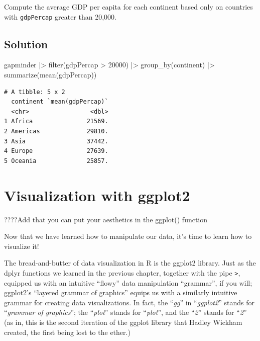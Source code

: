 \documentclass[
  letterpaper,
  DIV=11,
  numbers=noendperiod]{scrreprt}
\newenvironment{Shaded}{\begin{snugshade}}{\end{snugshade}}
\newcommand{\DecValTok}[1]{\textcolor[rgb]{0.68,0.00,0.00}{#1}}
\newcommand{\FunctionTok}[1]{\textcolor[rgb]{0.28,0.35,0.67}{#1}}
\newcommand{\NormalTok}[1]{\textcolor[rgb]{0.00,0.23,0.31}{#1}}
\newcommand{\SpecialCharTok}[1]{\textcolor[rgb]{0.37,0.37,0.37}{#1}}
\begin{document}
Compute the average GDP per capita for each continent based only on
countries with \texttt{gdpPercap} greater than 20,000.

\section{Solution}

\begin{Shaded}
\begin{Highlighting}[]
\NormalTok{gapminder }\SpecialCharTok{|\textgreater{}}
  \FunctionTok{filter}\NormalTok{(gdpPercap }\SpecialCharTok{\textgreater{}} \DecValTok{20000}\NormalTok{) }\SpecialCharTok{|\textgreater{}}
  \FunctionTok{group\_by}\NormalTok{(continent) }\SpecialCharTok{|\textgreater{}}
  \FunctionTok{summarize}\NormalTok{(}\FunctionTok{mean}\NormalTok{(gdpPercap))}
\end{Highlighting}
\end{Shaded}

\begin{verbatim}
# A tibble: 5 x 2
  continent `mean(gdpPercap)`
  <chr>                 <dbl>
1 Africa               21569.
2 Americas             29810.
3 Asia                 37442.
4 Europe               27639.
5 Oceania              25857.
\end{verbatim}

\chapter{Visualization with ggplot2}\label{visualization-with-ggplot2}

????Add that you can put your aesthetics in the ggplot() function

Now that we have learned how to manipulate our data, it's time to learn
how to visualize it!

The bread-and-butter of data visualization in R is the ggplot2 library.
Just as the dplyr functions we learned in the previous chapter, together
with the pipe \texttt{\textbar{}\textgreater{}}, equipped us with an
intuitive ``flowy'' data manipulation ``grammar'', if you will;
ggplot2's ``layered grammar of graphics'' equips us with a similarly
intuitive grammar for creating data visualizations. In fact, the
``\emph{gg}'' in ``\emph{ggplot2}'' stands for ``\emph{grammar of
graphics}''; the ``\emph{plot}'' stands for ``\emph{plot}'', and the
``\emph{2}'' stands for ``\emph{2}'' (as in, this is the second
iteration of the ggplot library that Hadley Wickham created, the first
being lost to the ether.)
\end{document}
